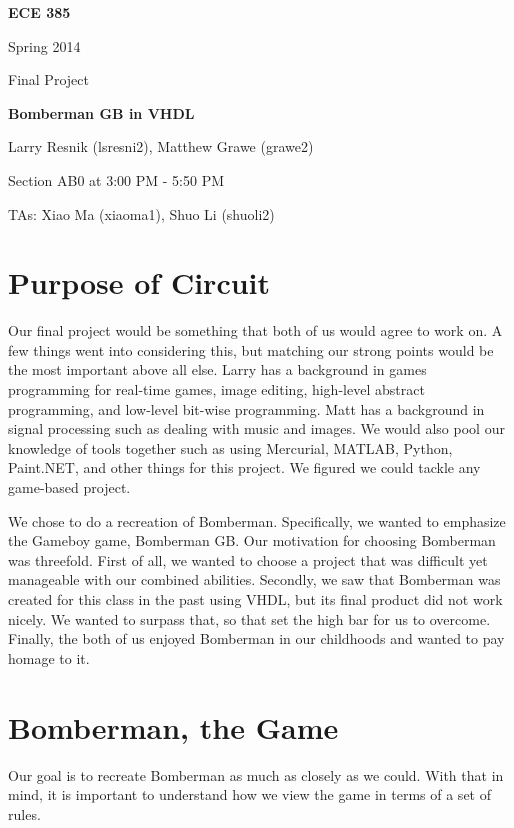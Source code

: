 \documentclass[10pt,a4paper]{article}
\begin{document}
\begin{center}
\textbf{\LARGE ECE 385}

\vspace{0.5em}
{\LARGE Spring 2014}

{\LARGE Final Project}

\vfill
\textbf{\LARGE Bomberman GB in VHDL}
\vfill

Larry Resnik (lsresni2), Matthew Grawe (grawe2)

Section AB0 at 3:00 PM - 5:50 PM

TAs: Xiao Ma (xiaoma1), Shuo Li (shuoli2)
\end{center}
\pagebreak

\tableofcontents

\section{Purpose of Circuit}
Our final project would be something that both of us would agree to work on. A few things went into considering this, but matching our strong points would be the most important above all else. Larry has a background in games programming for real-time games, image editing, high-level abstract programming, and low-level bit-wise programming. Matt has a background in signal processing such as dealing with music and images. We would also pool our knowledge of tools together such as using Mercurial, MATLAB, Python, Paint.NET, and other things for this project. We figured we could tackle any game-based project.

We chose to do a recreation of Bomberman. Specifically, we wanted to emphasize the Gameboy game, Bomberman GB. Our motivation for choosing Bomberman was threefold. First of all, we wanted to choose a project that was difficult yet manageable with our combined abilities. Secondly, we saw that Bomberman was created for this class in the past using VHDL, but its final product did not work nicely. We wanted to surpass that, so that set the high bar for us to overcome. Finally, the both of us enjoyed Bomberman in our childhoods and wanted to pay homage to it.

\section{Bomberman, the Game}
Our goal is to recreate Bomberman as much as closely as we could. With that in mind, it is important to understand how we view the game in terms of a set of rules.
\end{document}
